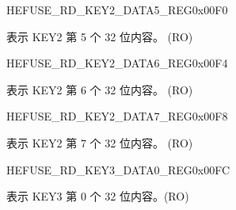 \begin{register}{H}{EFUSE\_RD\_KEY2\_DATA5\_REG}{0x{}00F0}\label{regdesc:EFUSERDKEY2DATA5REG}
%
\regnewline%
\begin{regdesc}\begin{reglist}
\label{fielddesc:EFUSEKEY2DATA5}\item [EFUSE\_KEY2\_DATA5] 表示 KEY2 第 5 个 32 位内容。 (RO)
\end{reglist}\end{regdesc}
\end{register}


\begin{register}{H}{EFUSE\_RD\_KEY2\_DATA6\_REG}{0x{}00F4}\label{regdesc:EFUSERDKEY2DATA6REG}
%
\regnewline%
\begin{regdesc}\begin{reglist}
\label{fielddesc:EFUSEKEY2DATA6}\item [EFUSE\_KEY2\_DATA6] 表示 KEY2 第 6 个 32 位内容。 (RO)
\end{reglist}\end{regdesc}
\end{register}


\begin{register}{H}{EFUSE\_RD\_KEY2\_DATA7\_REG}{0x{}00F8}\label{regdesc:EFUSERDKEY2DATA7REG}
%
\regnewline%
\begin{regdesc}\begin{reglist}
\label{fielddesc:EFUSEKEY2DATA7}\item [EFUSE\_KEY2\_DATA7] 表示 KEY2 第 7 个 32 位内容。 (RO)
\end{reglist}\end{regdesc}
\end{register}


\begin{register}{H}{EFUSE\_RD\_KEY3\_DATA0\_REG}{0x{}00FC}\label{regdesc:EFUSERDKEY3DATA0REG}
%
\regnewline%
\begin{regdesc}\begin{reglist}
\label{fielddesc:EFUSEKEY3DATA0}\item [EFUSE\_KEY3\_DATA0] 表示 KEY3 第 0 个 32 位内容。(RO)
\end{reglist}\end{regdesc}
\end{register}


